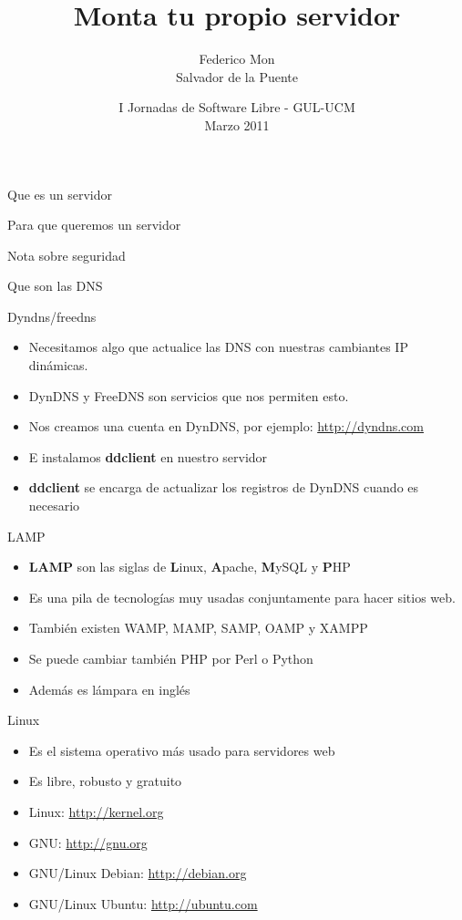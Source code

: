 \documentclass[spanish]{beamer}
\title[Monta tu propio servidor - GUL-UCM]
{Monta tu propio servidor
}
\author[\url{http://gulucm.org}]
{
Federico Mon\\
Salvador de la Puente
}
\institute{Facultad de Informática.\\Universidad Complutense de Madrid.}
\date{
I Jornadas de Software Libre - GUL-UCM\\
Marzo 2011}
\begin{document}
\frame{\titlepage}
\begin{frame}{Que es un servidor}
\end{frame}
\begin{frame}{Para que queremos un servidor}
\end{frame}
\begin{frame}{Nota sobre seguridad}
\end{frame}
\begin{frame}{Que son las DNS}
\end{frame}
\begin{frame}{Dyndns/freedns}
\begin{itemize}
\item Necesitamos algo que actualice las DNS con nuestras cambiantes IP 
dinámicas.
\item DynDNS y FreeDNS son servicios que nos permiten esto.
\item Nos creamos una cuenta en DynDNS, por ejemplo: \url{http://dyndns.com}
\item E instalamos \textbf{ddclient} en nuestro servidor
\item \textbf{ddclient} se encarga de actualizar los registros de DynDNS
cuando es necesario
\end{itemize}
\end{frame}
\begin{frame}{LAMP}
\begin{itemize}
\item \textbf{LAMP} son las siglas de \textbf{L}inux, \textbf{A}pache, \textbf{M}ySQL y \textbf{P}HP
\item Es una pila de tecnologías muy usadas conjuntamente para hacer sitios web.
\item También existen WAMP, MAMP, SAMP, OAMP y XAMPP
\item Se puede cambiar también PHP por Perl o Python
\item Además es lámpara en inglés
\end{itemize}
\end{frame}
\begin{frame}{Linux}
\begin{itemize}
\item Es el sistema operativo más usado para servidores web
\item Es libre, robusto y gratuito
\item Linux: \url{http://kernel.org}
\item GNU: \url{http://gnu.org}
\item GNU/Linux Debian: \url{http://debian.org}
\item GNU/Linux Ubuntu: \url{http://ubuntu.com}
\end{itemize}
\end{frame}
\end{document}
